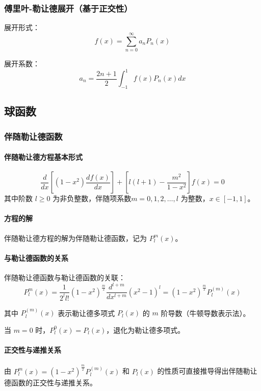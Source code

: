 \documentclass{article}
\begin{document}
	
	\subsubsection{傅里叶-勒让德展开（基于正交性）}
	
	展开形式：
	\[
	f(x) = \sum_{n=0}^{\infty} a_n P_n(x)
	\]
	
	展开系数：
	\[
	a_n = \frac{2n + 1}{2} \int_{-1}^{1} f(x) P_n(x) dx
	\]
	
	\subsection{ 球函数}
	
	\subsubsection{伴随勒让德函数}
	
	\paragraph{伴随勒让德方程基本形式}
	\[
	\frac{d}{dx}\left[(1 - x^2) \frac{df(x)}{dx}\right] + \left[l(l + 1) - \frac{m^2}{1 - x^2}\right] f(x) = 0
	\]
	其中阶数 \( l \geq 0 \) 为非负整数，伴随项系数\( m = 0, 1, 2, \dots, l \) 为整数，\( x \in [-1, 1] \)。
	
	\paragraph{方程的解}
	伴随勒让德方程的解为伴随勒让德函数，记为 \( P_l^m(x) \)。
	
	\paragraph{与勒让德函数的关系}
	伴随勒让德函数与勒让德函数的关联：
	\[
	P_l^m(x)= \frac{1}{2^l l!} (1 - x^2)^{\frac{m}{2}} \frac{d^{l + m}}{dx^{l + m}} (x^2 - 1)^l = (1 - x^2)^{\frac{m}{2}} P_l^{(m)}(x)
	\]
	
	
	其中 \( P_l^{(m)}(x) \) 表示勒让德多项式 \( P_l(x) \) 的 \( m \) 阶导数（牛顿导数表示法）。
	
	当 \( m = 0 \) 时，\( P_l^0(x) = P_l(x) \)，退化为勒让德多项式。
	
	\paragraph{正交性与递推关系}
	由 \( P_l^m(x) = (1 - x^2)^{\frac{m}{2}} P_l^{(m)}(x) \) 和 \( P_l(x) \) 的性质可直接推导得出伴随勒让德函数的正交性与递推关系。
	
\end{document}
